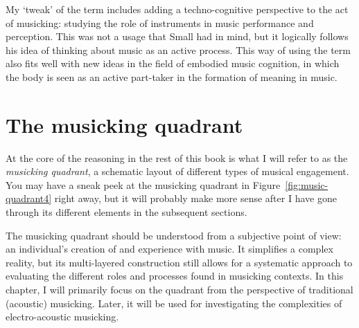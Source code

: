My `tweak' of the term includes adding a techno-cognitive perspective to the act of musicking: studying the role of instruments in music performance and perception. This was not a usage that Small had in mind, but it logically follows his idea of thinking about music as an active process. This way of using the term also fits well with new ideas in the field of embodied music cognition, in which the body is seen as an active part-taker in the formation of meaning in music.







\section{The musicking quadrant}\label{sec:quadrant}

At the core of the reasoning in the rest of this book is what I will refer to as the \emph{musicking quadrant}, a schematic layout of different types of musical engagement. You may have a sneak peek at the musicking quadrant in Figure~\ref{fig:music-quadrant4} right away, but it will probably make more sense after I have gone through its different elements in the subsequent sections.

The musicking quadrant should be understood from a subjective point of view: an individual's creation of and experience with music.
It simplifies a complex reality, but its multi-layered construction still allows for a systematic approach to evaluating the different roles and processes found in musicking contexts. In this chapter, I will primarily focus on the quadrant from the perspective of traditional (acoustic) musicking. Later, it will be used for investigating the complexities of electro-acoustic musicking.

